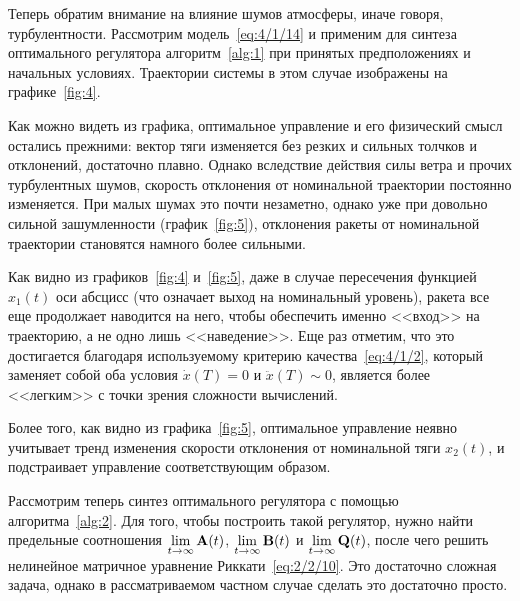 \br

Теперь обратим внимание на влияние шумов атмосферы, иначе говоря, турбулентности. Рассмотрим модель~\ref{eq:4/1/14} и применим для синтеза оптимального регулятора алгоритм~\ref{alg:1} при принятых предположениях и начальных условиях. Траектории системы в этом случае изображены на графике~\ref{fig:4}.


Как можно видеть из графика, оптимальное управление и его физический смысл остались прежними: вектор тяги изменяется без резких и сильных толчков и отклонений, достаточно плавно. Однако вследствие действия силы ветра и прочих турбулентных шумов, скорость отклонения от номинальной траектории постоянно изменяется. При малых шумах это почти незаметно, однако уже при довольно сильной зашумленности (график~\ref{fig:5}), отклонения ракеты от номинальной траектории становятся намного более сильными.


Как видно из графиков~\ref{fig:4} и~\ref{fig:5}, даже в случае пересечения функцией $x_1(t)$ оси абсцисс (что означает выход на номинальный уровень), ракета все еще продолжает наводится на него, чтобы обеспечить именно <<вход>> на траекторию, а не одно лишь <<наведение>>. Еще раз отметим, что это достигается благодаря используемому критерию качества~\vref{eq:4/1/2}, который заменяет собой оба условия $\dot{x}(T)=0$ и $\ddot{x}(T) \sim 0$, является более <<легким>> с точки зрения сложности вычислений.

Более того, как видно из графика~\ref{fig:5}, оптимальное управление неявно учитывает тренд изменения скорости отклонения от номинальной тяги $x_2(t)$, и подстраивает управление соответствующим образом.

\br

Рассмотрим теперь синтез оптимального регулятора с помощью алгоритма~\vref{alg:2}. Для того, чтобы построить такой регулятор, нужно найти предельные соотношения $\lim\limits_{t \to \infty} \mathbf{A}(t)$, $\lim\limits_{t \to \infty} \mathbf{B}(t)$ и $\lim\limits_{t \to \infty} \mathbf{Q}(t)$, после чего решить нелинейное матричное уравнение Риккати~\vref{eq:2/2/10}. Это достаточно сложная задача, однако в рассматриваемом частном случае сделать это достаточно просто.


